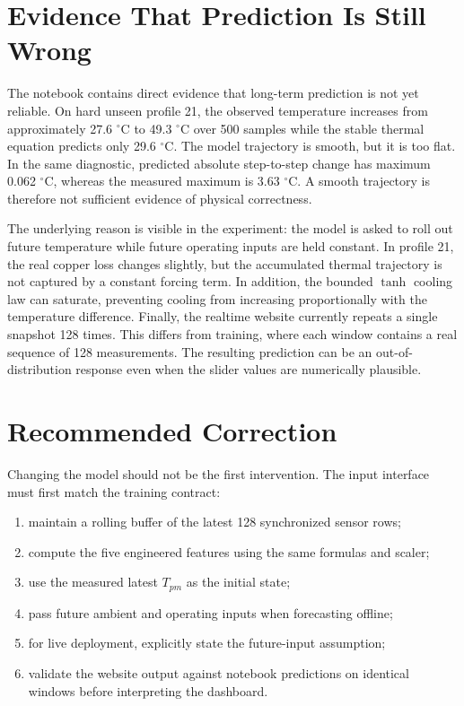 \documentclass[conference]{IEEEtran}
\begin{document}
\section{Evidence That Prediction Is Still Wrong}
The notebook contains direct evidence that long-term prediction is not yet
reliable. On hard unseen profile 21, the observed temperature increases from
approximately 27.6 $^{\circ}$C to 49.3 $^{\circ}$C over 500 samples while the
stable thermal equation predicts only 29.6 $^{\circ}$C. The model trajectory is
smooth, but it is too flat. In the same diagnostic, predicted absolute
step-to-step change has maximum 0.062 $^{\circ}$C, whereas the measured maximum
is 3.63 $^{\circ}$C. A smooth trajectory is therefore not sufficient evidence
of physical correctness.

The underlying reason is visible in the experiment: the model is asked to
roll out future temperature while future operating inputs are held constant.
In profile 21, the real copper loss changes slightly, but the accumulated
thermal trajectory is not captured by a constant forcing term. In addition,
the bounded $\tanh$ cooling law can saturate, preventing cooling from
increasing proportionally with the temperature difference. Finally, the
realtime website currently repeats a single snapshot 128 times. This differs
from training, where each window contains a real sequence of 128 measurements.
The resulting prediction can be an out-of-distribution response even when the
slider values are numerically plausible.

\section{Recommended Correction}
Changing the model should not be the first intervention. The input interface
must first match the training contract:
\begin{enumerate}[leftmargin=1.5em]
\item maintain a rolling buffer of the latest 128 synchronized sensor rows;
\item compute the five engineered features using the same formulas and scaler;
\item use the measured latest $T_{pm}$ as the initial state;
\item pass future ambient and operating inputs when forecasting offline;
\item for live deployment, explicitly state the future-input assumption;
\item validate the website output against notebook predictions on identical
windows before interpreting the dashboard.
\end{enumerate}
\end{document}
